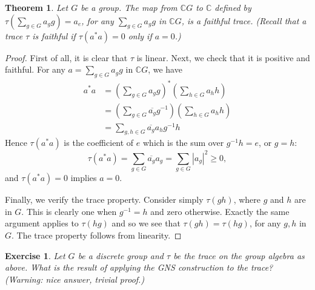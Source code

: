 \documentclass{book}
\newtheorem{exercise}{Exercise}[section]
\newtheorem{theorem}[definition]{Theorem}
\begin{document}
\begin{theorem}
  Let \(G\) be a group. The map from \(\mathbb{C}G\) to \(\mathbb{C}\) defined by
  \(\tau(\sum_{g\in G} a_g g) = a_e\), for any \(\sum_{g\in G}a_g g\) in \(\mathbb{C}G\), is a faithful trace. (Recall that
  a trace \(\tau\) is faithful if \(\tau(a^*a) = 0\) only if \(a = 0\).)
\end{theorem}
\begin{proof}
  First of all, it is clear that \(\tau\) is linear. Next, we check that
  it is positive and faithful. For any \(a = \sum_{g\in G} a_g g\) in \(\mathbb{C}G\), we have
  \begin{align*}
    a^*a&={\left(\sum_{g\in G} a_g g\right)}^*\left(\sum_{h\in G} a_h h\right)\\
    &={\left(\sum_{g\in G} \overline{a_g} g^{-1}\right)}\left(\sum_{h\in G} a_h h\right)\\
    &=\sum_{g,h\in G}\overline{a_g}a_h g^{-1}h
  \end{align*}
  Hence \(\tau(a^*a)\) is the coefficient of \(e\) which is the sum over \(g^{-1}h = e\), or \(g = h\): 
  \[
  \tau(a^*a) = \sum_{g\in G}\overline{a_g}a_g =\sum_{g\in G}|a_g|^2 \geq 0,
  \]
  and \(\tau(a^*a) = 0\) implies \(a = 0\).\par
  Finally, we verify the trace property. Consider simply \(\tau(gh)\), where \(g\) and
  \(h\) are in \(G\). This is clearly one when \(g^{-1} = h\) and zero otherwise. Exactly
  the same argument applies to \(\tau(hg)\) and so we see that \(\tau(gh) = \tau(hg)\), for
  any \(g,h\) in \(G\). The trace property follows from linearity.
\end{proof}
\begin{exercise}
  Let \(G\) be a discrete group and \(\tau\) be the trace on the group
  algebra as above. What is the result of applying the GNS construction to the
  trace? (Warning: nice answer, trivial proof.)
\end{exercise}
\end{document}

